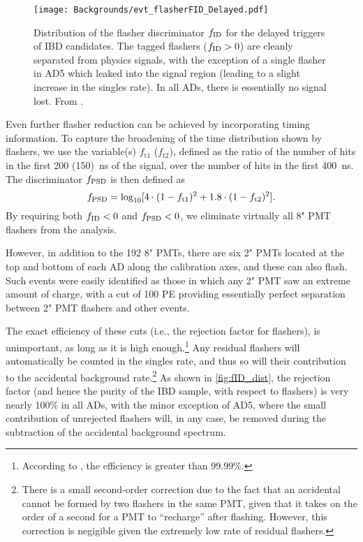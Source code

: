 \documentclass[../thesis.tex]{subfiles}
\begin{document}
\begin{figure}[h]
  \texttt{[image: Backgrounds/evt\_flasherFID\_Delayed.pdf]}
  \caption{Distribution of the flasher discriminator $f_{\mathrm{ID}}$ for the delayed triggers of IBD candidates. The tagged flashers ($f_{\mathrm{ID}} > 0$) are cleanly separated from physics signals, with the exception of a single flasher in AD5 which leaked into the signal region (leading to a slight increase in the singles rate). In all ADs, there is essentially no signal lost. From \cite{An_2017}.}
  \label{fig:fID_dist}
\end{figure}

Even further flasher reduction can be achieved by incorporating timing information. To capture the broadening of the time distribution shown by flashers, we use the variable(s) $f_{\mathrm{t}1}$ ($f_{\mathrm{t}2}$), defined as the ratio of the number of hits in the first 200 (150)~ns of the signal, over the number of hits in the first 400~ns. The discriminator $f_{\mathrm{PSD}}$ is then defined as
\begin{equation}
  f_{\mathrm{PSD}} = \log_{10} [4 \cdot (1 - f_{\mathrm{t}1})^2 + 1.8 \cdot (1 - f_{\mathrm{t}2})^2].
\end{equation}
By requiring both $f_{\mathrm{ID}} < 0$ and $f_{\mathrm{PSD}} < 0$, we eliminate virtually all 8" PMT flashers from the analysis.

However, in addition to the 192 8" PMTs, there are six 2" PMTs located at the top and bottom of each AD along the calibration axes, and these can also flash. Such events were easily identified as those in which any 2" PMT saw an extreme amount of charge, with a cut of 100 PE providing essentially perfect separation between 2" PMT flashers and other events.

The exact efficiency of these cuts (i.e., the rejection factor for flashers), is unimportant, as long as it is high enough.\footnote{According to \cite{SideBySide}, the efficiency is greater than $99.99\%$.} Any residual flashers will automatically be counted in the singles rate, and thus so will their contribution to the accidental background rate.\footnote{There is a small second-order correction due to the fact that an accidental cannot be formed by two flashers in the same PMT, given that it takes on the order of a second for a PMT to ``recharge'' after flashing. However, this correction is negigible given the extremely low rate of residual flashers.} As shown in \autoref{fig:fID_dist}, the rejection factor (and hence the purity of the IBD sample, with respect to flashers) is very nearly 100\% in all ADs, with the minor exception of AD5, where the small contribution of unrejected flashers will, in any case, be removed during the subtraction of the accidental background spectrum.
\end{document}
